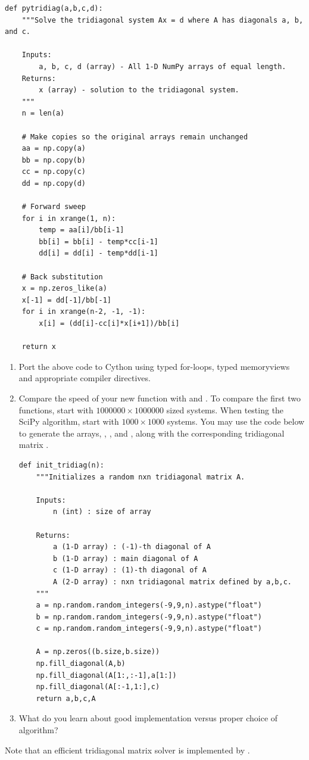 \begin{lstlisting}
def pytridiag(a,b,c,d):
    """Solve the tridiagonal system Ax = d where A has diagonals a, b, and c.
    
    Inputs:
        a, b, c, d (array) - All 1-D NumPy arrays of equal length.
    Returns:
        x (array) - solution to the tridiagonal system.
    """
    n = len(a)
    
    # Make copies so the original arrays remain unchanged
    aa = np.copy(a)
    bb = np.copy(b)
    cc = np.copy(c)
    dd = np.copy(d)
    
    # Forward sweep
    for i in xrange(1, n):
        temp = aa[i]/bb[i-1]
        bb[i] = bb[i] - temp*cc[i-1] 
        dd[i] = dd[i] - temp*dd[i-1]

    # Back substitution
    x = np.zeros_like(a)
    x[-1] = dd[-1]/bb[-1]
    for i in xrange(n-2, -1, -1):
        x[i] = (dd[i]-cc[i]*x[i+1])/bb[i]

    return x
\end{lstlisting}

\begin{problem} \label{prob:tridiag}
\leavevmode
\begin{enumerate}
\item Port the above code to Cython using typed for-loops, typed memoryviews and appropriate compiler directives.
\item Compare the speed of your new function with  and .
To compare the first two functions, start with $1000000 \times 1000000$ sized systems.
When testing the SciPy algorithm, start with $1000 \times 1000$ systems. You may use the code below to generate the arrays, , , and , along with the corresponding tridiagonal matrix .
\begin{lstlisting}
def init_tridiag(n):
    """Initializes a random nxn tridiagonal matrix A.
    
    Inputs:
        n (int) : size of array
    
    Returns:
        a (1-D array) : (-1)-th diagonal of A
        b (1-D array) : main diagonal of A
        c (1-D array) : (1)-th diagonal of A
        A (2-D array) : nxn tridiagonal matrix defined by a,b,c. 
    """
    a = np.random.random_integers(-9,9,n).astype("float")
    b = np.random.random_integers(-9,9,n).astype("float")
    c = np.random.random_integers(-9,9,n).astype("float")

    A = np.zeros((b.size,b.size))
    np.fill_diagonal(A,b)
    np.fill_diagonal(A[1:,:-1],a[1:])
    np.fill_diagonal(A[:-1,1:],c)
    return a,b,c,A
\end{lstlisting}
\item What do you learn about good implementation versus proper choice of algorithm?
\end{enumerate}
Note that an efficient tridiagonal matrix solver is implemented by .
\end{problem}

